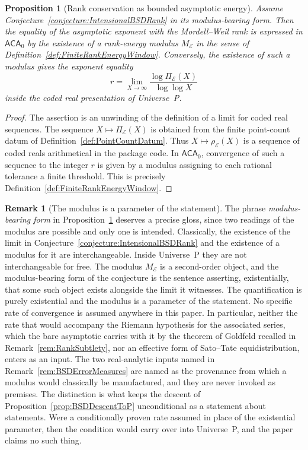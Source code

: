 \documentclass[10pt, reqno]{amsart}
\theoremstyle{plain}
\newtheorem{proposition}[theorem]{Proposition}
\theoremstyle{definition}
\newtheorem{remark}[theorem]{Remark}
\theoremstyle{plain}
\begin{document}
\begin{proposition}[Rank conservation as bounded asymptotic energy]
\label{prop:RankConservationFiniteAsymptotics}
Assume Conjecture~\ref{conjecture:IntensionalBSDRank} in its modulus-bearing form. Then the equality of the asymptotic exponent with the Mordell--Weil rank is expressed in $\mathsf{ACA}_{0}$ by the existence of a rank-energy modulus $M_{\mathcal{E}}$ in the sense of Definition~\ref{def:FiniteRankEnergyWindow}. Conversely, the existence of such a modulus gives the exponent equality
\[
  r
  =
  \lim_{X\to\infty}
  \frac{\log \Pi_{\mathcal{E}}(X)}{\log\log X}
\]
inside the coded real presentation of Universe~P.
\end{proposition}

\begin{proof}
The assertion is an unwinding of the definition of a limit for coded real sequences. The sequence $X\mapsto \Pi_{\mathcal{E}}(X)$ is obtained from the finite point-count datum of Definition~\ref{def:PointCountDatum}. Thus $X\mapsto \rho_{\mathcal{E}}(X)$ is a sequence of coded reals arithmetical in the package code. In $\mathsf{ACA}_{0}$, convergence of such a sequence to the integer $r$ is given by a modulus assigning to each rational tolerance a finite threshold. This is precisely Definition~\ref{def:FiniteRankEnergyWindow}.
\end{proof}

\begin{remark}[The modulus is a parameter of the statement]
\label{rem:ModulusExistentialParameter}
The phrase \emph{modulus-bearing form} in Proposition~\ref{prop:RankConservationFiniteAsymptotics} deserves a precise gloss, since two readings of the modulus are possible and only one is intended. Classically, the existence of the limit in Conjecture~\ref{conjecture:IntensionalBSDRank} and the existence of a modulus for it are interchangeable. Inside Universe~P they are not interchangeable for free. The modulus $M_{\mathcal{E}}$ is a second-order object, and the modulus-bearing form of the conjecture is the sentence asserting, existentially, that some such object exists alongside the limit it witnesses. The quantification is purely existential and the modulus is a parameter of the statement. No specific rate of convergence is assumed anywhere in this paper. In particular, neither the rate that would accompany the Riemann hypothesis for the associated series, which the bare asymptotic carries with it by the theorem of Goldfeld recalled in Remark~\ref{rem:RankSubtlety}, nor an effective form of Sato--Tate equidistribution, enters as an input. The two real-analytic inputs named in Remark~\ref{rem:BSDErrorMeasures} are named as the provenance from which a modulus would classically be manufactured, and they are never invoked as premises. The distinction is what keeps the descent of Proposition~\ref{prop:BSDDescentToP} unconditional as a statement about statements. Were a conditionally proven rate assumed in place of the existential parameter, then the condition would carry over into Universe~P, and the paper claims no such thing.
\end{remark}
\end{document}
